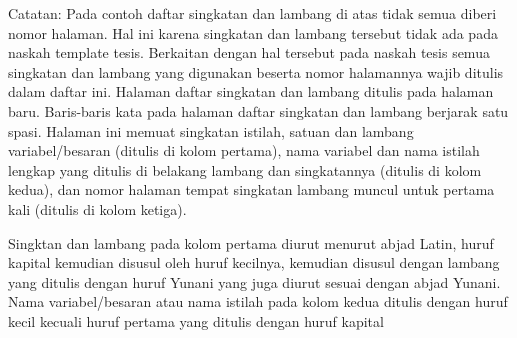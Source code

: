 \documentclass{itb-thesis}
\begin{document}
\vspace{14pt}
\begin{onehalfspace}
Catatan: Pada contoh daftar singkatan dan lambang di atas tidak semua diberi nomor halaman. Hal ini karena singkatan dan lambang tersebut tidak ada pada naskah template tesis. Berkaitan dengan hal tersebut pada naskah tesis semua singkatan dan lambang yang digunakan beserta nomor halamannya wajib ditulis dalam daftar ini. Halaman daftar singkatan dan lambang ditulis pada halaman baru. Baris-baris kata pada halaman daftar singkatan dan lambang berjarak satu spasi. Halaman ini memuat singkatan istilah, satuan dan lambang variabel/besaran (ditulis di kolom pertama), nama variabel dan nama istilah lengkap yang ditulis di belakang lambang dan singkatannya (ditulis di kolom kedua), dan nomor halaman tempat singkatan lambang muncul untuk pertama kali (ditulis di kolom ketiga).

Singktan dan lambang pada kolom pertama diurut menurut abjad Latin, huruf kapital kemudian disusul oleh huruf kecilnya, kemudian disusul dengan lambang yang ditulis dengan huruf Yunani yang juga diurut sesuai dengan abjad Yunani. Nama variabel/besaran atau nama istilah pada kolom kedua ditulis dengan huruf kecil kecuali huruf pertama yang ditulis dengan huruf kapital
\end{onehalfspace}
\end{document}
